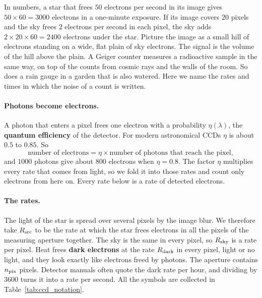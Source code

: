 In numbers, a star that frees $50$ electrons per second in its image gives $50\times60=3000$ electrons in a one-minute exposure. If its image covers $20$ pixels and the sky frees $2$ electrons per second in each pixel, the sky adds $2\times20\times60=2400$ electrons under the star. Picture the image as a small hill of electrons standing on a wide, flat plain of sky electrons. The signal is the volume of the hill above the plain. A Geiger counter measures a radioactive sample in the same way, on top of the counts from cosmic rays and the walls of the room. So does a rain gauge in a garden that is also watered. Here we name the rates and times in which the noise of a count is written.

\paragraph{Photons become electrons.} A photon that enters a pixel frees one electron with a probability $\eta(\lambda)$, the \textbf{quantum efficiency} of the detector. For modern astronomical CCDs $\eta$ is about $0.5$ to $0.85$. So
\begin{equation*}
	\text{number of electrons} = \eta\times\text{number of photons that reach the pixel},
\end{equation*}
and $1000$ photons give about $800$ electrons when $\eta=0.8$. The factor $\eta$ multiplies every rate that comes from light, so we fold it into those rates and count only electrons from here on. Every rate below is a rate of detected electrons.

\paragraph{The rates.} The light of the star is spread over several pixels by the image blur. We therefore take $R_{\rm src}$ to be the rate at which the star frees electrons in all the pixels of the measuring aperture together. The sky is the same in every pixel, so $R_{\rm sky}$ is a rate per pixel. Heat frees \textbf{dark electrons} at the rate $R_{\rm dark}$ in every pixel, light or no light, and they look exactly like electrons freed by photons. The aperture contains $n_{\rm pix}$ pixels. Detector manuals often quote the dark rate per hour, and dividing by $3600$ turns it into a rate per second. All the symbols are collected in Table~\ref{tab:ccd_notation}.

